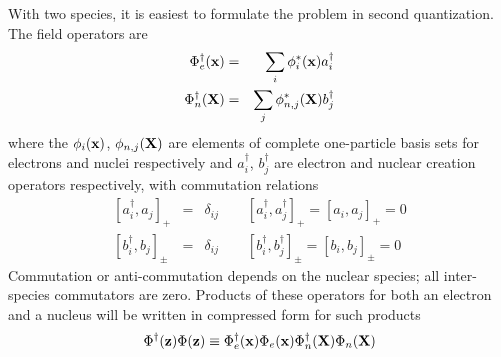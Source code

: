 With two species, it is easiest to formulate the problem in second
quantization. The field operators are 
\begin{eqnarray}
\Phi^{\dagger}_{e}({\bf x}) & = & \sum_{i} \phi^{*}_{i}({\bf x}%
)a_{i}^{\dagger}  \nonumber \\
\Phi^{\dagger}_{n}({\bf X}) & = & \sum_{j} \phi_{n,j}^{*}({\bf X}%
)b_{j}^{\dagger}  \label{fieldop}
\end{eqnarray}
where the $\phi_{i}({\bf x})$, $\phi_{n,j}({\bf X})$ are elements of
complete one-particle basis sets for electrons and nuclei respectively and $%
a_{i}^{\dagger}$, $b_{j}^{\dagger}$ are electron and nuclear creation
operators respectively, with commutation relations 
\begin{eqnarray}
\left[ a_{i}^{\dagger}, a_{j} \right]_{+} & = & \delta_{ij} \qquad \left[
a_{i}^{\dagger}, a^{\dagger}_{j} \right]_{+} = \left[ a_{i}, a_{j} \right]%
_{+} = 0  \nonumber \\
\left[ b_{i}^{\dagger}, b_{j} \right]_{\pm} & = & \delta_{ij} \qquad \left[
b_{i}^{\dagger}, b^{\dagger}_{j} \right]_{\pm} = \left[ b_{i},b_{j} \right]%
_{\pm} = 0
\end{eqnarray}
Commutation or anti-commutation depends on the nuclear species; all
inter-species commutators are zero. Products of these operators for both an
electron and a nucleus will be written in compressed form for such products 
\begin{equation}
\Phi^{\dagger}({\bf z})\Phi ({\bf z}) \equiv\Phi^{\dagger}_{e}({\bf x})
\Phi_{e}({\bf x})\Phi^{\dagger}_{n}({\bf X}) \Phi_{n}({\bf X})
\label{fieldopprod}
\end{equation}

